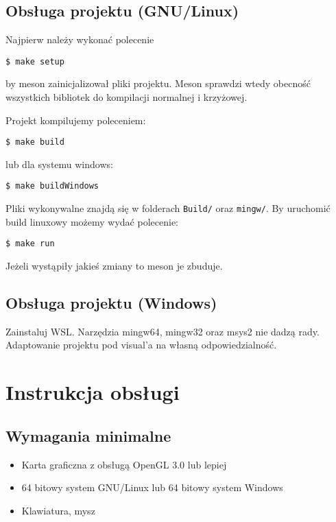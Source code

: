 \documentclass[a4paper,11pt]{article}
\begin{document}
\subsection*{Obsługa projektu (GNU/Linux)}

Najpierw należy wykonać polecenie
\begin{lstlisting}[frame=single,basicstyle=\ttfamily]
$ make setup
\end{lstlisting}
by meson zainicjalizował pliki projektu. Meson sprawdzi wtedy obecność wszystkich bibliotek do kompilacji normalnej i krzyżowej.

Projekt kompilujemy poleceniem:
\begin{lstlisting}[frame=single,basicstyle=\ttfamily]
$ make build
\end{lstlisting}
lub dla systemu windows:
\begin{lstlisting}[frame=single,basicstyle=\ttfamily]
$ make buildWindows
\end{lstlisting}

Pliki wykonywalne znajdą się w folderach \texttt{Build/} oraz \texttt{mingw/}. By uruchomić build linuxowy możemy wydać polecenie:
\begin{lstlisting}[frame=single,basicstyle=\ttfamily]
$ make run
\end{lstlisting}

Jeżeli wystąpiły jakieś zmiany to meson je zbuduje.

\subsection*{Obsługa projektu (Windows)}

Zainstaluj WSL. Narzędzia mingw64, mingw32 oraz msys2 nie dadzą rady. Adaptowanie projektu pod visual'a na własną odpowiedzialność.

\section{Instrukcja obsługi}

\subsection*{Wymagania minimalne}

\begin{itemize}
    \item Karta graficzna z obsługą OpenGL 3.0 lub lepiej
    \item 64 bitowy system GNU/Linux lub 64 bitowy system Windows
    \item Klawiatura, mysz
\end{itemize}
\end{document}
